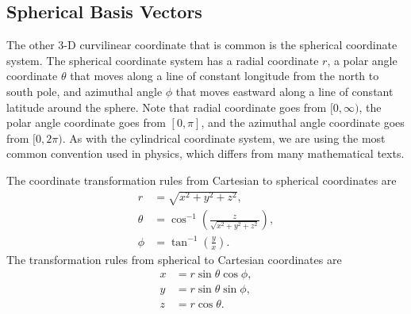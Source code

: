 \subsection{Spherical Basis Vectors}

The other 3-D curvilinear coordinate that is common is the spherical coordinate system. The spherical coordinate system has a radial coordinate $r$, a polar angle coordinate $\theta$ that moves along a line of constant longitude from the north to south pole, and azimuthal angle $\phi$ that moves eastward along a line of constant latitude around the sphere. Note that radial coordinate goes from $[0,\infty)$, the polar angle coordinate goes from $[0,\pi]$, and the azimuthal angle coordinate goes from $[0,2\pi)$. As with the cylindrical coordinate system, we are using the most common convention used in physics, which differs from many mathematical texts.

The coordinate transformation rules from Cartesian to spherical coordinates are
\begin{subequations}
\begin{align}
  r &= \sqrt{ x^2 + y^2 + z^2 } , \\
  \theta &= \cos^{-1} \left( \frac{z}{ \sqrt{ x^2 + y^2 + z^2 } } \right), \\
  \phi &= \tan^{-1} \left( \frac{y}{x} \right) .
\end{align}
\end{subequations}
The transformation rules from spherical to Cartesian coordinates are
\begin{subequations}
\begin{align}
  x &= r \sin \theta \cos \phi , \\
  y &= r \sin \theta \sin \phi, \\
  z &= r \cos \theta .
\end{align}
\end{subequations}


